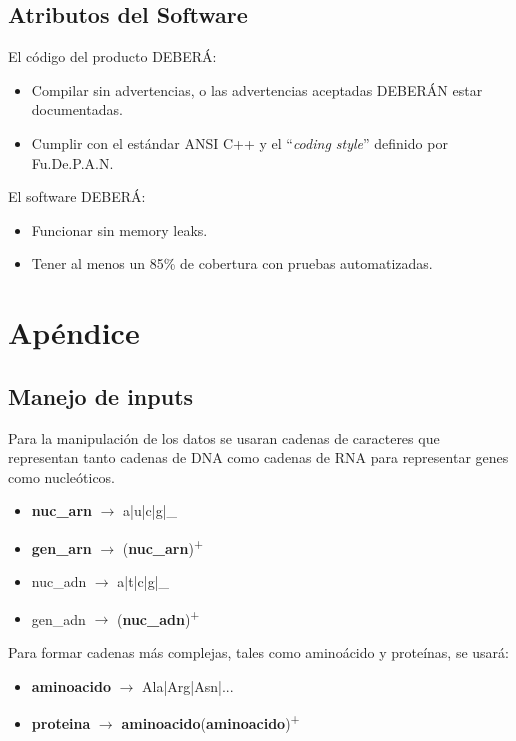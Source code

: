 \documentclass[12pt,a4paper,english,spanish]{article}
\begin{document}
\subsection{Atributos del Software}
\par El código del producto DEBERÁ:
\begin{itemize}
 \item Compilar sin advertencias, o las advertencias aceptadas DEBERÁN estar documentadas.
 \item Cumplir con el estándar ANSI C++ y el ``\textit{coding style}'' definido por Fu.De.P.A.N.
\end{itemize}
\par El software DEBERÁ:
\begin{itemize}
	\item Funcionar sin memory leaks.
	\item Tener al menos un 85\% de cobertura con pruebas automatizadas.
\end{itemize}

\section{Apéndice}
\subsection{Manejo de inputs}
\par Para la manipulación de los datos se usaran cadenas de caracteres que representan tanto cadenas de DNA como cadenas de RNA para representar genes como nucleóticos.
\begin{itemize}
	\item \textbf{nuc\_arn} $\to$  a|u|c|g|\_ 
	\item \textbf{gen\_arn} $\to$ (\textbf{nuc\_arn})\textsuperscript{+}

	\item {nuc\_adn} $\to$ a|t|c|g|\_
	\item {gen\_adn} $\to$ (\textbf{nuc\_adn})\textsuperscript{+}
\end{itemize}
\par Para formar cadenas más complejas, tales como aminoácido y proteínas, se usará:
\begin{itemize}
 	\item \textbf{aminoacido} $\to$ Ala|Arg|Asn|...	
	\item \textbf{proteina} $\to$ \textbf{aminoacido}(\textbf{aminoacido})\textsuperscript{+}
\end{itemize}
\end{document}
